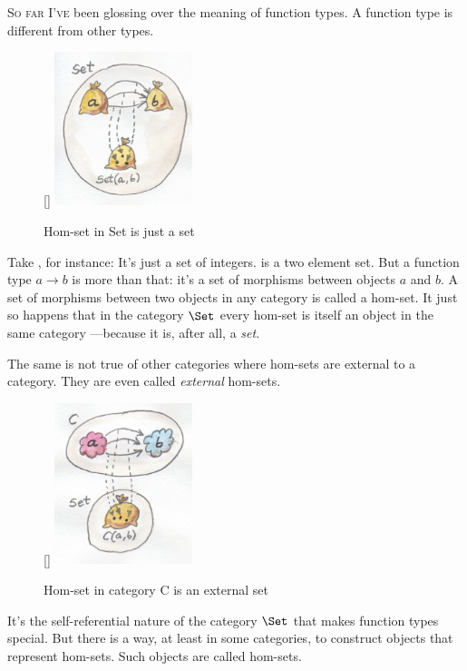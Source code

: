 \lettrine[lhang=0.17]{S}{o far I've} been glossing over the meaning of function types. A function
type is different from other types.

\begin{figure}
\raisebox{0pt}[\dimexpr{}\baselineskip\relax]{
\includegraphics[width=40mm]{images/set-hom-set.jpg}}%
\caption{Hom-set in Set is just a set}
\end{figure}

Take , for instance: It's just a set of integers.
 is a two element set. But a function type
$a\to b$ is more than that: it's a set of morphisms
between objects $a$ and $b$. A set of morphisms between
two objects in any category is called a hom-set. It just so happens that
in the category $\Set$ every hom-set is itself an object in the
same category ---because it is, after all, a \emph{set}.

The same is not true of other categories where hom-sets are external to
a category. They are even called \emph{external} hom-sets.

\pagebreak
\begin{figure}
\raisebox{0pt}[\dimexpr\height]{
\includegraphics[width=40mm]{images/hom-set.jpg}}%
\caption{Hom-set in category C is an external set}
\end{figure}

\noindent
It's the self-referential nature of the category $\Set$ that makes
function types special. But there is a way, at least in some categories,
to construct objects that represent hom-sets. Such objects are called
 hom-sets.

